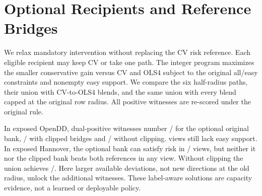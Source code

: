 \section{Optional Recipients and Reference Bridges}
We relax mandatory intervention without replacing the CV risk reference.
Each eligible recipient may keep CV or take one path. The integer
program maximizes the smaller conservative gain versus CV and OLS4
subject to the original all/easy constraints and nonempty easy support.
We compare the six half-radius paths, their union with CV-to-OLS4 blends,
and the same union with every blend capped at the original row radius.
All positive witnesses are re-scored under the original rule.

In exposed OpenDD, dual-positive witnesses number
\OptionalBridgeOpenOriginal/\OptionalBridgeOpenViews{} for the optional
original bank, \OptionalBridgeOpenClipped/\OptionalBridgeOpenViews{}
with clipped bridges and \OptionalBridgeOpenUnion/\OptionalBridgeOpenViews{}
without clipping. \OptionalBridgeAbsent{} views still lack easy support.
In exposed Hannover, the optional bank can satisfy risk in
\OptionalBridgeHanRiskOnly/\OptionalBridgeHanViews{} views, but neither
it nor the clipped bank beats both references in any view. Without
clipping the union achieves \OptionalBridgeHanUnion/\OptionalBridgeHanViews{}.
Here larger available deviations, not new directions at the old radius,
unlock the additional witnesses. These label-aware solutions are
capacity evidence, not a learned or deployable policy.
